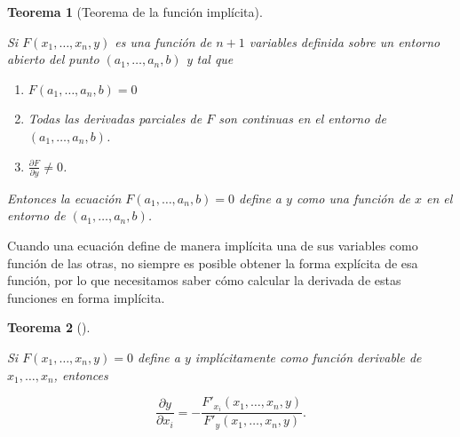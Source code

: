 \documentclass[
  a4paper,
]{scrreport}
\providecommand{\tightlist}{%
  \setlength{\itemsep}{0pt}\setlength{\parskip}{0pt}}\usepackage{longtable,booktabs,array}
\theoremstyle{definition}
\theoremstyle{plain}
\newtheorem{theorem}{Teorema}[chapter]
\theoremstyle{plain}
\theoremstyle{definition}
\theoremstyle{definition}
\theoremstyle{plain}
\theoremstyle{remark}
\begin{document}
\begin{theorem}[Teorema de la función
implícita]\protect\hypertarget{thm-funcion-implicita}{}\label{thm-funcion-implicita}

Si \(F(x_1,\ldots,x_n,y)\) es una función de \(n+1\) variables definida
sobre un entorno abierto del punto \((a_1,\ldots,a_n,b)\) y tal que

\begin{enumerate}
\def\labelenumi{\alph{enumi}.}
\tightlist
\item
  \(F(a_1,\ldots,a_n,b)=0\)
\item
  Todas las derivadas parciales de \(F\) son continuas en el entorno de
  \((a_1,\ldots,a_n,b)\).
\item
  \(\frac{\partial F}{\partial y}\neq 0\).
\end{enumerate}

Entonces la ecuación \(F(a_1,\ldots,a_n,b)=0\) define a \(y\) como una
función de \(x\) en el entorno de \((a_1,\ldots,a_n,b)\).

\end{theorem}

Cuando una ecuación define de manera implícita una de sus variables como
función de las otras, no siempre es posible obtener la forma explícita
de esa función, por lo que necesitamos saber cómo calcular la derivada
de estas funciones en forma implícita.

\begin{theorem}[]\protect\hypertarget{thm-derivada-implicita-funcion-varias-variables}{}\label{thm-derivada-implicita-funcion-varias-variables}

Si \(F(x_1,\ldots,x_n,y)=0\) define a \(y\) implícitamente como función
derivable de \(x_1,\ldots,x_n\), entonces

\[
\frac{\partial y}{\partial x_i} = -\frac{F'_{x_i}(x_1,\ldots,x_n,y)}{F'_{y}(x_1,\ldots,x_n,y)}.
\]

\end{theorem}
\end{document}
